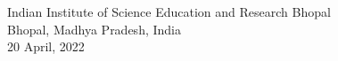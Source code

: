 \documentclass[a4paper, 12pt]{book}
\begin{document}
\begin{titlepage}
\begin{center}
\begin{figure}[H]
\end{figure}
\begin{large}
Indian Institute of Science Education and Research Bhopal\\
Bhopal, Madhya Pradesh, India\\
20 April, 2022
\end{large}
\end{center}

\end{titlepage}
\cleardoublepage

{}
\tableofcontents
\cleardoublepage

{}
\listoffigures
\cleardoublepage

{}
\listoftables
\cleardoublepage

\thispagestyle{plain2}
{}

\cleardoublepage

\newpage {}

\cleardoublepage




{}

\cleardoublepage


{}
\clearpage

%
\end{document}
